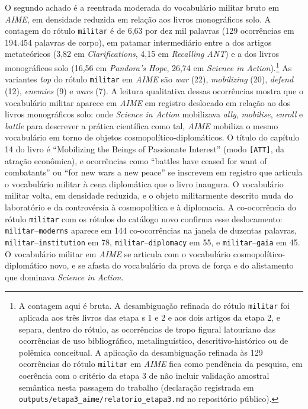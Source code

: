 O segundo achado é a reentrada moderada do vocabulário militar bruto em \textit{AIME}, em densidade reduzida em relação aos livros monográficos solo. A contagem do rótulo \texttt{militar} é de 6,63 por dez mil palavras (129 ocorrências em 194.454 palavras de corpo), em patamar intermediário entre a dos artigos metateóricos (3,82 em \emph{Clarifications}, 4,15 em \emph{Recalling ANT}) e a dos livros monográficos solo (16,56 em \emph{Pandora's Hope}, 26,74 em \emph{Science in Action}).\footnote{A contagem aqui é bruta. A desambiguação refinada do rótulo \texttt{militar} foi aplicada aos três livros das etapa s 1 e 2 e aos dois artigos da etapa  2, e separa, dentro do rótulo, as ocorrências de tropo figural latouriano das ocorrências de uso bibliográfico, metalinguístico, descritivo-histórico ou de polêmica conceitual. A aplicação da desambiguação refinada às 129 ocorrências do rótulo \texttt{militar} em \textit{AIME} fica como pendência da pesquisa, em coerência com o critério da etapa  3 de não incluir validação amostral semântica nesta passagem do trabalho (declaração registrada em \texttt{outputs/etapa3\_aime/relatorio\_etapa3.md} no repositório público).} As variantes \emph{top} do rótulo \texttt{militar} em \textit{AIME} são \emph{war} (22), \emph{mobilizing} (20), \emph{defend} (12), \emph{enemies} (9) e \emph{wars} (7). A leitura qualitativa dessas ocorrências mostra que o vocabulário militar aparece em \textit{AIME} em registro deslocado em relação ao dos livros monográficos solo: onde \emph{Science in Action} mobilizava \emph{ally}, \emph{mobilise}, \emph{enroll} e \emph{battle} para descrever a prática científica como tal, \textit{AIME} mobiliza o mesmo vocabulário em torno de objetos cosmopolítico-diplomáticos. O título do capítulo 14 do livro é \enquote{Mobilizing the Beings of Passionate Interest} (modo \texttt{[ATT]}, da atração econômica), e ocorrências como \enquote{battles have ceased for want of combatants} ou \enquote{for new wars a new peace} se inscrevem em registro que articula o vocabulário militar à cena diplomática que o livro inaugura. O vocabulário militar volta, em densidade reduzida, e o objeto militarmente descrito muda do laboratório e da controvérsia à cosmopolítica e à diplomacia. A co-ocorrência do rótulo \texttt{militar} com os rótulos do catálogo novo confirma esse deslocamento: \texttt{militar}--\texttt{moderns} aparece em 144 co-ocorrências na janela de duzentas palavras, \texttt{militar}--\texttt{institution} em 78, \texttt{militar}--\texttt{diplomacy} em 55, e \texttt{militar}--\texttt{gaia} em 45. O vocabulário militar em \textit{AIME} se articula com o vocabulário cosmopolítico-diplomático novo, e se afasta do vocabulário da prova de força e do alistamento que dominava \emph{Science in Action}.

